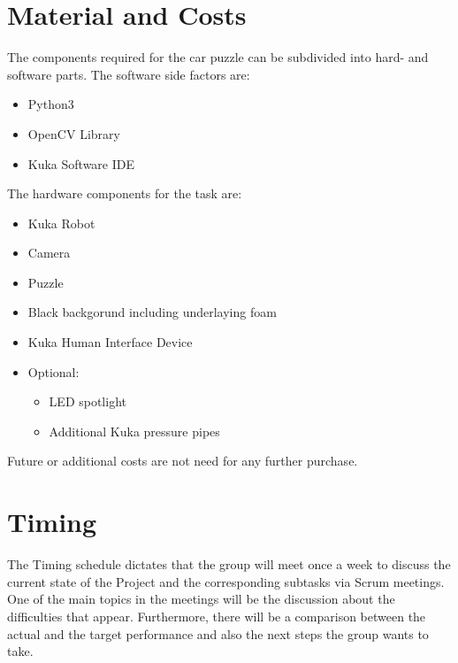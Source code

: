 \documentclass[a4paper, 12pt]{scrartcl}%
\begin{document}
	\section{Material and Costs}
	The components required for the car puzzle can be subdivided into hard- and software parts. The software side factors are:\newline
	\begin{itemize}
		\item Python3
		\item OpenCV Library
		\item Kuka Software IDE
	\end{itemize}
	The hardware components for the task are:\newline
	\begin{itemize}
		\item Kuka Robot
		\item Camera
		\item Puzzle
		\item Black backgorund including underlaying foam
		\item Kuka Human Interface Device
		\item Optional:
		\begin{itemize}
			\item LED spotlight
			\item Additional Kuka pressure pipes
		\end{itemize}
	\end{itemize}
	Future or additional costs are not need for any further purchase.\newline
	
	\section{Timing}
	The Timing schedule dictates that the group will meet once a week to discuss the current state of the Project and the corresponding subtasks via Scrum meetings. One of the main topics in the meetings will be the discussion about the difficulties that appear. Furthermore, there will be a comparison between the actual and the target performance and also the next steps the group wants to take.\newline
	
	
\end{document}
